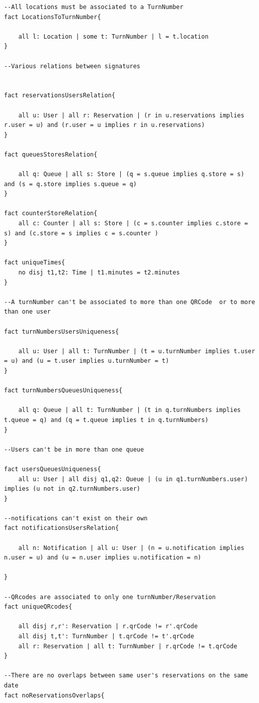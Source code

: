\documentclass{article}
\begin{document}
\begin{lstlisting}[language=alloy]
--All locations must be associated to a TurnNumber
fact LocationsToTurnNumber{

	all l: Location | some t: TurnNumber | l = t.location
}

--Various relations between signatures


fact reservationsUsersRelation{

    all u: User | all r: Reservation | (r in u.reservations implies r.user = u) and (r.user = u implies r in u.reservations)
}

fact queuesStoresRelation{

    all q: Queue | all s: Store | (q = s.queue implies q.store = s) and (s = q.store implies s.queue = q)
}

fact counterStoreRelation{
	all c: Counter | all s: Store | (c = s.counter implies c.store = s) and (c.store = s implies c = s.counter )
}

fact uniqueTimes{
	no disj t1,t2: Time | t1.minutes = t2.minutes
}

--A turnNumber can't be associated to more than one QRCode  or to more than one user

fact turnNumbersUsersUniqueness{

    all u: User | all t: TurnNumber | (t = u.turnNumber implies t.user = u) and (u = t.user implies u.turnNumber = t)
}

fact turnNumbersQueuesUniqueness{

    all q: Queue | all t: TurnNumber | (t in q.turnNumbers implies t.queue = q) and (q = t.queue implies t in q.turnNumbers)
}

--Users can't be in more than one queue

fact usersQueuesUniqueness{
	all u: User | all disj q1,q2: Queue | (u in q1.turnNumbers.user) implies (u not in q2.turnNumbers.user)
}

--notifications can't exist on their own
fact notificationsUsersRelation{

	all n: Notification | all u: User | (n = u.notification implies n.user = u) and (u = n.user implies u.notification = n)

}

--QRcodes are associated to only one turnNumber/Reservation
fact uniqueQRcodes{

    all disj r,r': Reservation | r.qrCode != r'.qrCode
    all disj t,t': TurnNumber | t.qrCode != t'.qrCode
    all r: Reservation | all t: TurnNumber | r.qrCode != t.qrCode
}

--There are no overlaps between same user's reservations on the same date
fact noReservationsOverlaps{


\end{lstlisting}
\end{document}

